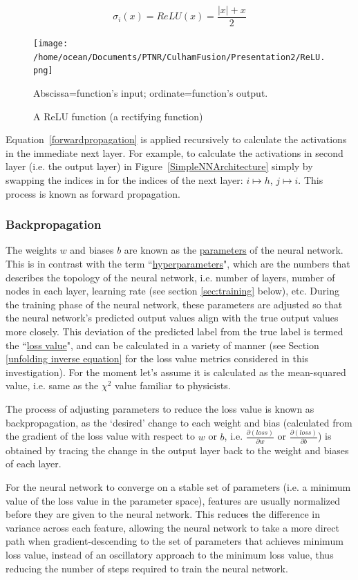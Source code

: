 \documentclass[a4paper, 12pt]{article}
\begin{document}
\begin{equation}
    \sigma_i(x) = ReLU(x) = \frac{|x|+x}{2}
\end{equation}
\begin{figure}
    \centering
    \texttt{[image: /home/ocean/Documents/PTNR/CulhamFusion/Presentation2/ReLU.png]}
    \caption{A ReLU function (a rectifying function)}\label{ReLU}
    Abscissa=function's input; ordinate=function's output.
\end{figure}

Equation~\ref{forwardpropagation} is applied recursively to calculate the activations in the immediate next layer. For example, to calculate the activations in second layer (i.e. the output layer) in Figure~\ref{SimpleNNArchitecture} simply by swapping the indices in for the indices of the next layer: $i\mapsto h$, $j\mapsto i$. This process is known as forward propagation.

\subsubsection{Backpropagation}
    The weights $w$ and biases $b$ are known as the \underline{parameters} of the neural network. This is in contrast with the term ``\underline{hyperparameters}", which are the numbers that describes the topology of the neural network, i.e. number of layers, number of nodes in each layer, learning rate (see section \ref{sec:training} below), etc. During the training phase of the neural network, these parameters are adjusted so that the neural network's predicted output values align with the true output values more closely. This deviation of the predicted label from the true label is termed the ``\underline{loss value}", and can be calculated in a variety of manner (see Section \ref{unfolding inverse equation} for the loss value metrics considered in this investigation). For the moment let's assume it is calculated as the mean-squared value, i.e. same as the $\chi^2$ value familiar to physicists.

    The process of adjusting parameters to reduce the loss value is known as backpropagation, as the `desired' change to each weight and bias (calculated from the gradient of the loss value with respect to $w$ or $b$, i.e. $\frac{\partial (loss)}{\partial w}$ or $\frac{\partial (loss)}{\partial b}$) is obtained by tracing the change in the output layer back to the weight and biases of each layer.

    For the neural network to converge on a stable set of parameters (i.e. a minimum value of the loss value in the parameter space), features are usually normalized before they are given to the neural network. This reduces the difference in variance across each feature, allowing the neural network to take a more direct path when gradient-descending to the set of parameters that achieves minimum loss value, instead of an oscillatory approach to the minimum loss value\cite{AndrewNgNormalization}, thus reducing the number of steps required to train the neural network.
\end{document}
